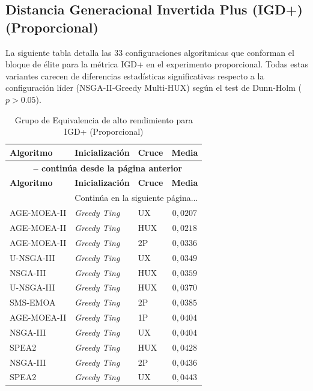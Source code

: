 \subsection{Distancia Generacional Invertida Plus (IGD+) (Proporcional)}\label{anexo:elite_igd_prop}

La siguiente tabla detalla las 33 configuraciones algorítmicas que conforman el bloque de élite para la métrica IGD+ en el experimento proporcional. Todas estas variantes carecen de diferencias estadísticas significativas respecto a la configuración líder (NSGA-II-Greedy Multi-HUX) según el test de Dunn-Holm ($p > 0.05$).

\begin{longtable}{lllc}
    \caption{Grupo de Equivalencia de alto rendimiento para IGD+ (Proporcional)}
    \label{tab:elite_igd_prop} \\
    \toprule
    \textbf{Algoritmo} & \textbf{Inicialización} & \textbf{Cruce} & \textbf{Media} \\
    \midrule
    \endfirsthead
    \multicolumn{4}{c}{{\bfseries \tablename\ \thetable{} -- continúa desde la página anterior}} \\
    \toprule
    \textbf{Algoritmo} & \textbf{Inicialización} & \textbf{Cruce} & \textbf{Media} \\
    \midrule
    \endhead
    \midrule \multicolumn{4}{r}{{Continúa en la siguiente página...}} \\
    \endfoot
    \bottomrule
    \endlastfoot
    AGE-MOEA-II & \textit{Greedy Ting} & UX & $0{,}0207$ \\
AGE-MOEA-II & \textit{Greedy Ting} & HUX & $0{,}0218$ \\
AGE-MOEA-II & \textit{Greedy Ting} & 2P & $0{,}0336$ \\
U-NSGA-III & \textit{Greedy Ting} & UX & $0{,}0349$ \\
NSGA-III & \textit{Greedy Ting} & HUX & $0{,}0359$ \\
U-NSGA-III & \textit{Greedy Ting} & HUX & $0{,}0370$ \\
SMS-EMOA & \textit{Greedy Ting} & 2P & $0{,}0385$ \\
AGE-MOEA-II & \textit{Greedy Ting} & 1P & $0{,}0404$ \\
NSGA-III & \textit{Greedy Ting} & UX & $0{,}0404$ \\
SPEA2 & \textit{Greedy Ting} & HUX & $0{,}0428$ \\
NSGA-III & \textit{Greedy Ting} & 2P & $0{,}0436$ \\
SPEA2 & \textit{Greedy Ting} & UX & $0{,}0443$ \\

\end{longtable}
